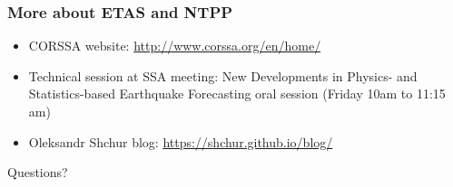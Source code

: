 \documentclass{beamer}
\begin{document}
	\begin{frame}
		\frametitle{More about ETAS and NTPP}
		\begin{itemize}
			\item CORSSA website: \url{http://www.corssa.org/en/home/}

			\vspace{1em}

			\item Technical session at SSA meeting: New Developments in Physics- and Statistics-based Earthquake Forecasting oral session (Friday 10am to 11:15 am)

			\vspace{1em}

			\item Oleksandr Shchur blog: \url{https://shchur.github.io/blog/}
		\end{itemize}
	\end{frame}
		
	\begin{frame}
		\begin{Huge}
			\begin{center}
				Questions?
			\end{center}
		\end{Huge}
	\end{frame}
			
\end{document}
